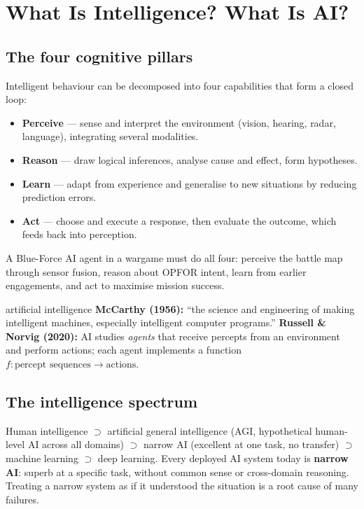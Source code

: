 \documentclass[11pt]{article}
\begin{document}
\section{What Is Intelligence? What Is AI?}
\subsection{The four cognitive pillars}
Intelligent behaviour can be decomposed into four capabilities that form a closed loop:
\begin{itemize}
\item \textbf{Perceive} --- sense and interpret the environment (vision, hearing, radar, language), integrating several modalities.
\item \textbf{Reason} --- draw logical inferences, analyse cause and effect, form hypotheses.
\item \textbf{Learn} --- adapt from experience and generalise to new situations by reducing prediction errors.
\item \textbf{Act} --- choose and execute a response, then evaluate the outcome, which feeds back into perception.
\end{itemize}
A Blue-Force AI agent in a wargame must do all four: perceive the battle map through sensor fusion, reason about OPFOR intent, learn from earlier engagements, and act to maximise mission success.

\begin{definition}{artificial intelligence}
\textbf{McCarthy (1956):} ``the science and engineering of making intelligent machines, especially intelligent computer programs.'' \textbf{Russell \& Norvig (2020):} AI studies \emph{agents} that receive percepts from an environment and perform actions; each agent implements a function $f:\text{percept sequences}\to\text{actions}$.
\end{definition}

\subsection{The intelligence spectrum}
Human intelligence $\supset$ artificial general intelligence (AGI, hypothetical human-level AI across all domains) $\supset$ narrow AI (excellent at one task, no transfer) $\supset$ machine learning $\supset$ deep learning. Every deployed AI system today is \textbf{narrow AI}: superb at a specific task, without common sense or cross-domain reasoning. Treating a narrow system as if it understood the situation is a root cause of many failures.
\end{document}
